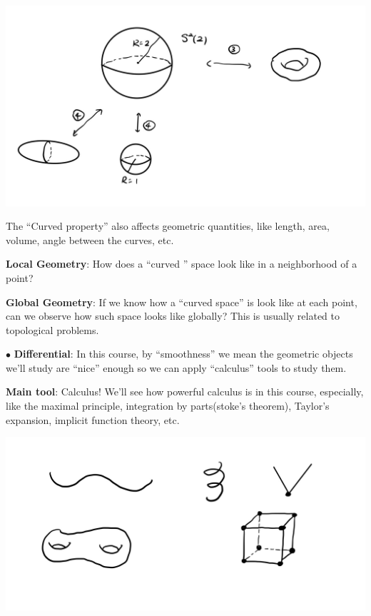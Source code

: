 \begin{center}
    \includegraphics[scale=0.2]{picture/preface_example2.jpg}
\end{center}

The ``Curved property'' also affects geometric quantities, like length, area, volume, angle between the curves, etc.

\textbf{Local Geometry}: How does a ``curved '' space look like in a neighborhood of a point?
 
\textbf{Global Geometry}: If we know how a ``curved space'' is look like at each point, can we observe how such space looks like globally? This is usually related to topological problems.

$\bullet$ \textbf{Differential}: In this course, by ``smoothness'' we mean the geometric objects we'll study are ``nice'' enough so we can apply ``calculus'' tools to study them.

\textbf{Main tool}: Calculus! We'll see how powerful calculus is in this course, especially, like the maximal principle, integration by parts(stoke's theorem), Taylor's expansion, implicit function theory, etc.

\begin{center}
    \includegraphics[scale=0.2]{picture/preface_example3.jpg}
\end{center}


